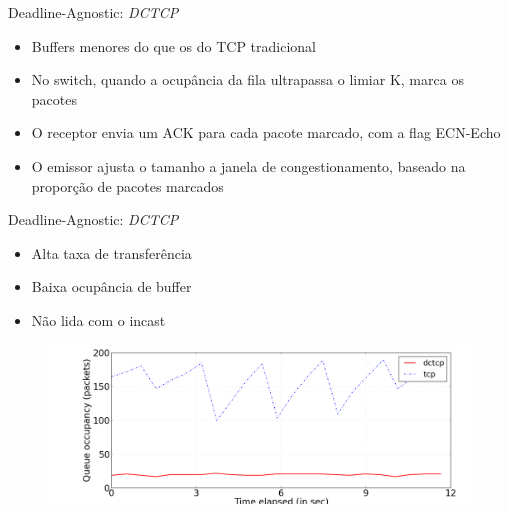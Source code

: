\documentclass[aspectratio=169]{beamer}
\begin{document}
	
	
	
	\begin{frame} {Deadline-Agnostic: \textit{DCTCP}}
	    
	    \Large
	    \begin{itemize}
	                                 
	        \item
	          Buffers menores do que os do TCP tradicional
	        \item
	          No switch, quando a ocupância da fila ultrapassa o limiar K, marca os pacotes
	        \item
	          O receptor envia um ACK para cada pacote marcado, com a flag ECN-Echo
	        \item
	          O emissor ajusta o tamanho a janela de congestionamento, baseado na proporção de pacotes marcados     
	
	    \end{itemize}
	  
	\end{frame}
	  
	\begin{frame} {Deadline-Agnostic: \textit{DCTCP}}
	    \Large
	    \begin{itemize}
	                           
	    \item
	      Alta taxa de transferência
	    \item
	      Baixa ocupância de buffer
	    \item
	      Não lida com o incast
	  
		\end{itemize}      
	    \begin{figure}[ht]    
	        \includegraphics[scale=0.3]{imagens/dctcp_tcp_queue.png}
	    \end{figure}
	        
	
	    
	\end{frame}  
\end{document}
